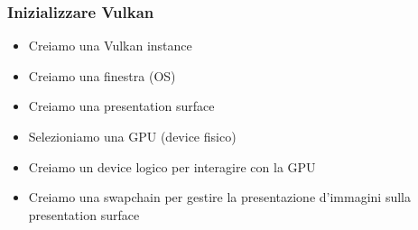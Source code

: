 \begin{frame}
\frametitle{Inizializzare Vulkan}

\begin{itemize}
\item Creiamo una Vulkan instance
\item Creiamo una finestra (OS)
\item Creiamo una presentation surface
\item Selezioniamo una GPU (device fisico)
\item Creiamo un device logico per interagire con la GPU
\item Creiamo una swapchain per gestire la presentazione d'immagini sulla presentation surface
\end{itemize}

\end{frame}
